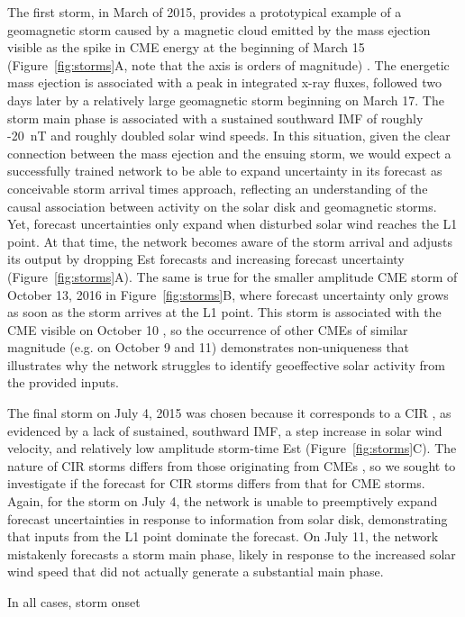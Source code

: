 \documentclass[draft,linenumbers]{agujournal2018}
\begin{document}
The first storm, in March of 2015, provides a prototypical example of a geomagnetic storm caused by a magnetic cloud emitted by the mass ejection visible as the spike in CME energy at the beginning of March 15 (Figure~\ref{fig:storms}A, note that the axis is orders of magnitude) \citep{Patel2019}. The energetic mass ejection is associated with a peak in integrated x-ray fluxes, followed two days later by a relatively large geomagnetic storm beginning on March 17. The storm main phase is associated with a sustained southward IMF of roughly -20~nT and roughly doubled solar wind speeds. In this situation, given the clear connection between the mass ejection and the ensuing storm, we would expect a successfully trained network to be able to expand uncertainty in its forecast as conceivable storm arrival times approach, reflecting an understanding of the causal association between activity on the solar disk and geomagnetic storms. Yet, forecast uncertainties only expand when disturbed solar wind reaches the L1 point. At that time, the network becomes aware of the storm arrival and adjusts its output by dropping Est forecasts and increasing forecast uncertainty (Figure~\ref{fig:storms}A). The same is true for the smaller amplitude CME storm of October 13, 2016 in Figure~\ref{fig:storms}B, where forecast uncertainty only grows as soon as the storm arrives at the L1 point. This storm is associated with the CME visible on October 10 \citep{Patel2019}, so the occurrence of other CMEs of similar magnitude (e.g. on October 9 and 11) demonstrates non-uniqueness that illustrates why the network struggles to identify geoeffective solar activity from the provided inputs.

The final storm on July 4, 2015 was chosen because it corresponds to a CIR \citep{Shen2017}, as evidenced by a lack of sustained, southward IMF, a step increase in solar wind velocity, and relatively low amplitude storm-time Est (Figure~\ref{fig:storms}C). The nature of CIR storms differs from those originating from CMEs \citep{Zhang2007}, so we sought to investigate if the forecast for CIR storms differs from that for CME storms. Again, for the storm on July 4, the network is unable to preemptively expand forecast uncertainties in response to information from solar disk, demonstrating that inputs from the L1 point dominate the forecast. On July 11, the network mistakenly forecasts a storm main phase, likely in response to the increased solar wind speed that did not actually generate a substantial main phase.

In all cases,  storm onset 
\end{document}
